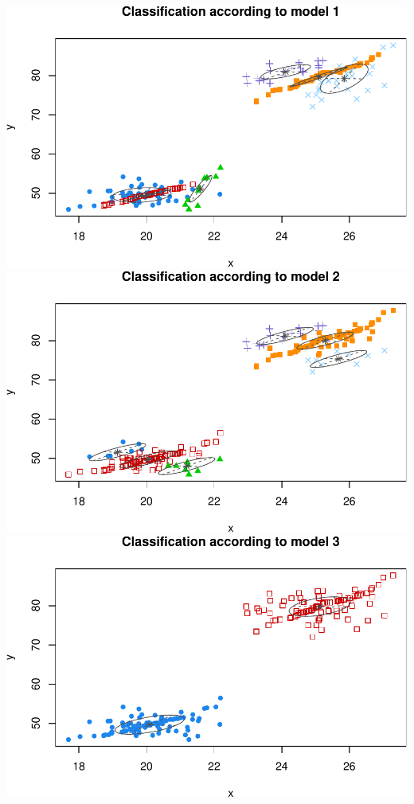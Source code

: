 \documentclass[]{article}
\begin{document}
\includegraphics{mclust_sim_files/figure-latex/unnamed-chunk-2-1.pdf}
\includegraphics{mclust_sim_files/figure-latex/unnamed-chunk-2-2.pdf}
\includegraphics{mclust_sim_files/figure-latex/unnamed-chunk-2-3.pdf}
\end{document}
